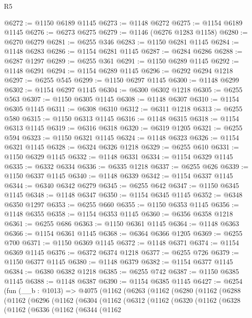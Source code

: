 \begin{lexlean}{R5}
\begin{coremodule}
@6272 := @1150 @6189 @1145
@6273 := @1148 @6272
@6275 := @1154 @6189 @1145
@6276 := @6273 @6275
@6279 := @1146 (@6276 @1283 @1158)
@6280 := @6270 @6279
@6281 := @6255 @346
@6283 := @1150 @6281 @1145
@6284 := @1148 @6283
@6286 := @1154 @6281 @1145
@6287 := @6284 @6286
@6288 := @6287 @1297
@6289 := @6255 @361
@6291 := @1150 @6289 @1145
@6292 := @1148 @6291
@6294 := @1154 @6289 @1145
@6296 := @6292 @6294 @1218
@6297 := @6255 @545
@6299 := @1150 @6297 @1145
@6300 := @1148 @6299
@6302 := @1154 @6297 @1145
@6304 := @6300 @6302 @1218
@6305 := @6255 @563
@6307 := @1150 @6305 @1145
@6308 := @1148 @6307
@6310 := @1154 @6305 @1145
@6311 := @6308 @6310
@6312 := @6311 @1218
@6313 := @6255 @580
@6315 := @1150 @6313 @1145
@6316 := @1148 @6315
@6318 := @1154 @6313 @1145
@6319 := @6316 @6318
@6320 := @6319 @1205
@6321 := @6255 @594
@6323 := @1150 @6321 @1145
@6324 := @1148 @6323
@6326 := @1154 @6321 @1145
@6328 := @6324 @6326 @1218
@6329 := @6255 @610
@6331 := @1150 @6329 @1145
@6332 := @1148 @6331
@6334 := @1154 @6329 @1145
@6335 := @6332 @6334
@6336 := @6335 @1218
@6337 := @6255 @626
@6339 := @1150 @6337 @1145
@6340 := @1148 @6339
@6342 := @1154 @6337 @1145
@6344 := @6340 @6342 @6279
@6345 := @6255 @642
@6347 := @1150 @6345 @1145
@6348 := @1148 @6347
@6350 := @1154 @6345 @1145
@6352 := @6348 @6350 @1297
@6353 := @6255 @660
@6355 := @1150 @6353 @1145
@6356 := @1148 @6355
@6358 := @1154 @6353 @1145
@6360 := @6356 @6358 @1218
@6361 := @6255 @686
@6363 := @1150 @6361 @1145
@6364 := @1148 @6363
@6366 := @1154 @6361 @1145
@6368 := @6364 @6366 @1205
@6369 := @6255 @700
@6371 := @1150 @6369 @1145
@6372 := @1148 @6371
@6374 := @1154 @6369 @1145
@6376 := @6372 @6374 @1218
@6377 := @6255 @726
@6379 := @1150 @6377 @1145
@6380 := @1148 @6379
@6382 := @1154 @6377 @1145
@6384 := @6380 @6382 @1218
@6385 := @6255 @742
@6387 := @1150 @6385 @1145
@6388 := @1148 @6387
@6390 := @1154 @6385 @1145
@6427 := @6254
    (fun (__b : @1013) =>
    @4075
      (@1162
        (@6263
          (@1162
            (@6280
              (@1162
                (@6288
                  (@1162
                    (@6296
                      (@1162
                        (@6304
                          (@1162
                            (@6312
                              (@1162
                                (@6320
                                  (@1162
                                    (@6328
                                      (@1162
                                        (@6336
                                          (@1162
                                            (@6344
                                              (@1162

\end{coremodule}
\end{lexlean}
